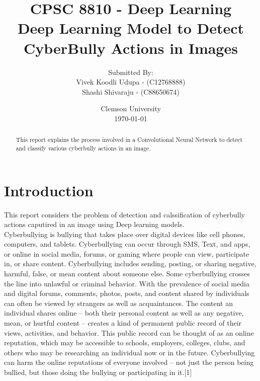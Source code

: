 \documentclass[12pt]{article}
\title{\bf CPSC 8810 - Deep Learning\\
Deep Learning Model to Detect CyberBully Actions in Images}
\author{Submitted By:\\	Vivek Koodli Udupa - (C12768888) \\
		Shashi Shivaraju - (C88650674)\\}
\date{Clemson University \\\today}
\begin{document}
\sloppy %
\begin{titlingpage}
\maketitle
{}%
\end{titlingpage}



\newpage
\begin{abstract}
\thispagestyle{plain}
This report explains the process involved in  a Convolutional Neural Network to detect and classify various cyberbully actions in an image. 
\end{abstract}
\newpage

\section{Introduction}
This report considers the problem of detection and calssification of cyberbully actions caputired in an image using Deep learning models.  \\

Cyberbullying is bullying that takes place over digital devices like cell phones, computers, and tablets. Cyberbullying can occur through SMS, Text, and apps, or online in social media, forums, or gaming where people can view, participate in, or share content. Cyberbullying includes sending, posting, or sharing negative, harmful, false, or mean content about someone else. Some cyberbullying crosses the line into unlawful or criminal behavior. With the prevalence of social media and digital forums, comments, photos, posts, and content shared by individuals can often be viewed by strangers as well as acquaintances. The content an individual shares online – both their personal content as well as any negative, mean, or hurtful content – creates a kind of permanent public record of their views, activities, and behavior. This public record can be thought of as an online reputation, which may be accessible to schools, employers, colleges, clubs, and others who may be researching an individual now or in the future. Cyberbullying can harm the online reputations of everyone involved – not just the person being bullied, but those doing the bullying or participating in it.[1] \\ 
\end{document}
